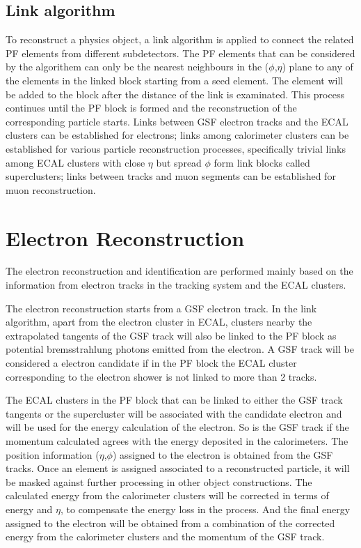 \subsection{Link algorithm}
To reconstruct a physics object, a link algorithm is applied to connect the related PF elements from different subdetectors. The PF elements that can be considered by the algorithem can only be the nearest neighbours in the ($\phi$,$\eta$) plane to any of the elements in the linked block starting from a seed element. The element will be added to the block after the distance of the link is examinated. This process continues until the PF block is formed and the reconstruction of the corresponding particle starts. Links between GSF electron tracks and the ECAL clusters can be established for electrons; links among calorimeter clusters can be established for various particle reconstruction processes, specifically trivial links among ECAL clusters with close $\eta$ but spread $\phi$ form link blocks called superclusters; links between tracks and muon segments can be established for muon reconstruction.

\section{Electron Reconstruction}
The electron reconstruction and identification are performed mainly based on the information from electron tracks in the tracking system and the ECAL clusters. ~\cite{ob_electronconst2}

\vspace{0.3cm}
The electron reconstruction starts from a GSF electron track. In the link algorithm, apart from the electron cluster in ECAL, clusters nearby the extrapolated tangents of the GSF track will also be linked to the PF block as potential bremsstrahlung photons emitted from the electron. A GSF track will be considered a electron candidate if in the PF block the ECAL cluster corresponding to the electron shower is not linked to more than 2 tracks. 

\vspace{0.3cm}
The ECAL clusters in the PF block that can be linked to either the GSF track tangents or the supercluster will be associated with the candidate electron and will be used for the energy calculation of the electron. So is the GSF track if the momentum calculated agrees with the energy deposited in the calorimeters. The position information ($\eta$,$\phi$) assigned to the electron is obtained from the GSF tracks. Once an element is assigned associated to a reconstructed particle, it will be masked against further processing in other object constructions. The calculated energy from the calorimeter clusters will be corrected in terms of energy and $\eta$, to compensate the energy loss in the process. And the final energy assigned to the electron will be obtained from a combination of the corrected energy from the calorimeter clusters and the momentum of the GSF track. 

